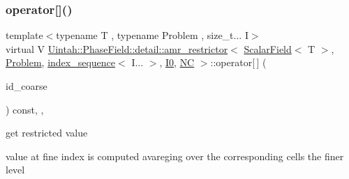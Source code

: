 \mbox{\label{classUintah_1_1PhaseField_1_1detail_1_1amr__restrictor_3_01ScalarField_3_01T_01_4_00_01Problem_05760ee5d1d3adcc969b3f56f71e72acb_ab29b8c1e68dba955e6062c84adca2ef4}} 
\subsubsection{\texorpdfstring{operator[]()}{operator[]()}\hspace{0.1cm}{\footnotesize\ttfamily [2/2]}}
{\footnotesize\ttfamily template$<$typename T , typename Problem , size\+\_\+t... I$>$ \\
virtual V \hyperlink{classUintah_1_1PhaseField_1_1detail_1_1amr__restrictor}{Uintah\+::\+Phase\+Field\+::detail\+::amr\+\_\+restrictor}$<$ \hyperlink{structUintah_1_1PhaseField_1_1ScalarField}{Scalar\+Field}$<$ T $>$, \hyperlink{classUintah_1_1PhaseField_1_1Problem}{Problem}, \hyperlink{namespaceUintah_1_1PhaseField_a237de804d99512e50613aff7c94a9461}{index\+\_\+sequence}$<$ I... $>$, \hyperlink{namespaceUintah_1_1PhaseField_a547ce3002aa97fbd3ef3192a6eec8406abdd8ebcbdfd71d1125937e3012dc45fb}{I0}, \hyperlink{namespaceUintah_1_1PhaseField_a33d355affda78a83f45755ba8388cedda77924170fe82bfd58b74ca3e44139718}{NC} $>$\+::operator\mbox{[}$\,$\mbox{]} (\begin{DoxyParamCaption}\item[{const Int\+Vector \&}]{id\+\_\+coarse }\end{DoxyParamCaption}) const\hspace{0.3cm}{\ttfamily [inline]}, {\ttfamily [override]}, {\ttfamily [virtual]}}



get restricted value 

value at fine index is computed avareging over the corresponding cells the finer level


